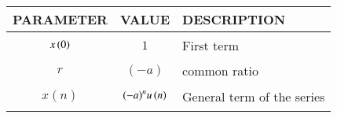 \begin{tabular}{|p{2cm}|p{2.5cm}|p{2.3cm}|}
    \hline
    PARAMETER & VALUE & DESCRIPTION  \\ \hline
    $$x\left(0\right)$$ & $$1$$ & First term \\ \hline
    $$r$$ & $$(-a)$$ & common ratio\\ \hline
    $$x(n)$$ & $$(-a)^{n}u\left(n\right)$$ & General term of the series  \\ 
    \hline
  \end{tabular}